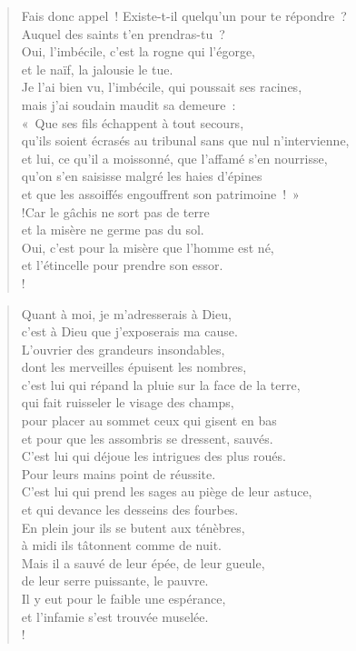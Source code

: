 \documentclass[french,twoside]{book} %
\def\mednobreak{\ifdim\lastskip<\medskipamount
  \removelastskip\nopagebreak\medskip\fi}
\newcommand{\labelblock}[1]{\medbreak{\noindent\color{rubric}\bfseries #1}\par\mednobreak}
\begin{document}
\begin{verse}
Fais donc appel ! Existe-t-il quelqu’un pour te répondre ? \\
Auquel des saints t’en prendras-tu ?\\
Oui, l’imbécile, c’est la rogne qui l’égorge, \\
et le naïf, la jalousie le tue.\\
Je l’ai bien vu, l’imbécile, qui poussait ses racines, \\
mais j’ai soudain maudit sa demeure :\\
« Que ses fils échappent à tout secours, \\
qu’ils soient écrasés au tribunal sans que nul n’intervienne,\\
et lui, ce qu’il a moissonné, que l’affamé s’en nourrisse, \\
qu’on s’en saisisse malgré les haies d’épines \\
et que les assoiffés engouffrent son patrimoine ! »\\!Car le gâchis ne sort pas de terre \\
et la misère ne germe pas du sol.\\
Oui, c’est pour la misère que l’homme est né, \\
et l’étincelle pour prendre son essor.\\!
\end{verse}

\labelblock{Appel à Dieu}


\begin{verse}
Quant à moi, je m’adresserais à Dieu, \\
c’est à Dieu que j’exposerais ma cause.\\
L’ouvrier des grandeurs insondables, \\
dont les merveilles épuisent les nombres,\\
c’est lui qui répand la pluie sur la face de la terre, \\
qui fait ruisseler le visage des champs,\\
pour placer au sommet ceux qui gisent en bas \\
et pour que les assombris se dressent, sauvés.\\
C’est lui qui déjoue les intrigues des plus roués. \\
Pour leurs mains point de réussite.\\
C’est lui qui prend les sages au piège de leur astuce, \\
et qui devance les desseins des fourbes.\\
En plein jour ils se butent aux ténèbres, \\
à midi ils tâtonnent comme de nuit.\\
Mais il a sauvé de leur épée, de leur gueule, \\
de leur serre puissante, le pauvre.\\
Il y eut pour le faible une espérance, \\
et l’infamie s’est trouvée muselée.\\!
\end{verse}
\end{document}
